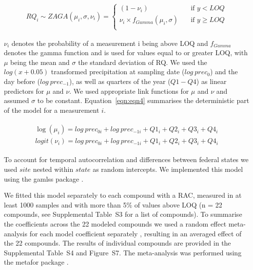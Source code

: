 \documentclass[journal=esthag,manuscript=article]{achemso}
\begin{document}
\begin{align}
RQ_i \sim ZAGA(\mu_i, \sigma, \nu_i) = 
  \begin{cases}
    (1 - \nu_i)   & \quad  \text{if } y < LOQ \\
    \nu_i \times f_{Gamma} (\mu_i, \sigma) & \quad \text{if } y \ge LOQ \\
  \end{cases}
  \label{eqn:eqn3}
\end{align}

$\nu_i$ denotes the probability of a measurement i being above LOQ and $f_{Gamma}$ denotes the gamma function and is used for values equal to or greater LOQ, with $\mu$ being the mean and $\sigma$ the standard deviation of RQ.
We used the $log(x+0.05)$ transformed precipitation at sampling date ($log~prec_0$) and the day before ($log~prec_{-1}$), as well as quarters of the year ($Q1-Q4$) as linear predictors for $\mu$ and $\nu$. 
We used appropriate link functions for $\mu$ and $\nu$ and assumed $\sigma$ to be constant. 
Equation~\ref{eqn:eqn4} summarises the deterministic part of the model for a measurement $i$.

\begin{align}
\begin{split}
\log(\mu_{i}) = log~prec_{0 i} + log~prec_{-1 i} + Q1_{i} + Q2_{i}+Q3_{i}+Q4_{i}\\
logit(\nu_{i}) = log~prec_{0 i} + log~prec_{-1 i} + Q1_{i} + Q2_{i}+Q3_{i}+Q4_{i}
\end{split}
\label{eqn:eqn4}
\end{align}

To account for temporal autocorrelation and differences between federal states we used $site$ nested within $state$ as random intercepts.
We implemented this model using the gamlss package \cite{stasinopoulos_generalized_2007}. 

We fitted this model separately to each compound with a RAC, measured in at least 1000 samples and with more than 5\% of values above LOQ (n = 22 compounds, see Supplemental Table~S3 for a list of compounds). 
To summarise the coefficients across the 22 modeled compounds we used a random effect meta-analysis for each model coefficient separately \citep{harrison_getting_2011}, resulting in an averaged effect of the 22 compounds.
The results of individual compounds are provided in the Supplemental Table~S4 and Figure~S7.
The meta-analysis was performed using the metafor package \citep{Viechtbauer_2010}. 
\end{document}
